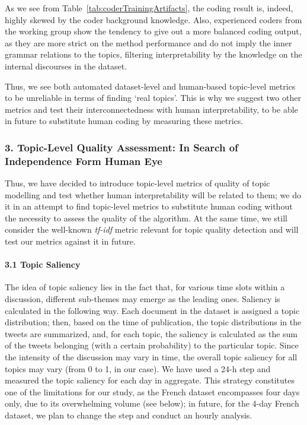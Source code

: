 As we see from Table~\cref{tab:coderTrainingArtifacts}, the coding result is, indeed, highly skewed by the coder background knowledge. Also, experienced coders from the working group show the tendency to give out a more balanced coding output, as they are more strict on the method performance and do not imply the inner grammar relations to the topics, filtering interpretability by the knowledge on the internal discourses in the dataset.

Thus, we see both automated dataset-level and human-based topic-level metrics to be unreliable in terms of finding ‘real topics’. This is why we suggest two other metrics and test their interconnectedness with human interpretability, to be able in future to substitute human coding by measuring these metrics.

\subsubsection{3. Topic-Level Quality Assessment: In Search of Independence Form Human Eye}

Thus, we have decided to introduce topic-level metrics of quality of topic modelling and test whether human interpretability will be related to them; we do it in an attempt to find topic-level metrics to substitute human coding without the necessity to assess the quality of the algorithm. At the same time, we still consider the well-known \textit{tf-idf} metric relevant for topic quality detection and will test our metrics against it in future.

\paragraph{3.1 Topic Saliency}

The idea of topic saliency lies in the fact that, for various time slots within a discussion, different sub-themes may emerge as the leading ones. Saliency is calculated in the following way. Each document in the dataset is assigned a topic distribution; then, based on the time of publication, the topic distributions in the tweets are summarized, and, for each topic, the saliency is calculated as the sum of the tweets belonging (with a certain probability) to the particular topic. Since the intensity of the discussion may vary in time, the overall topic saliency for all topics may vary (from 0 to 1, in our case). We have used a 24-h step and measured the topic saliency for each day in aggregate. This strategy constitutes one of the limitations for our study, as the French dataset encompasses four days only, due to its overwhelming volume (see below); in future, for the 4-day French dataset, we plan to change the step and conduct an hourly analysis.

